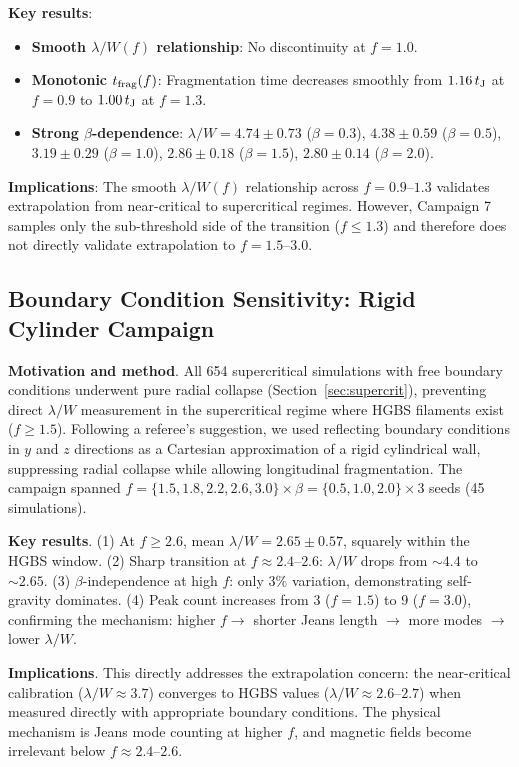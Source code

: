 \documentclass[twocolumn]{mnras}
\begin{document}
\textbf{Key results}:
\begin{itemize}
    \item \textbf{Smooth $\lambda/W(f)$ relationship}: No discontinuity at $f = 1.0$.
    \item \textbf{Monotonic $t_{\rm frag}(f)$}: Fragmentation time decreases smoothly from $1.16\,t_{\rm J}$ at $f = 0.9$ to $1.00\,t_{\rm J}$ at $f = 1.3$.
    \item \textbf{Strong $\beta$-dependence}: $\lambda/W = 4.74 \pm 0.73$ ($\beta = 0.3$), $4.38 \pm 0.59$ ($\beta = 0.5$), $3.19 \pm 0.29$ ($\beta = 1.0$), $2.86 \pm 0.18$ ($\beta = 1.5$), $2.80 \pm 0.14$ ($\beta = 2.0$).
\end{itemize}

\textbf{Implications}: The smooth $\lambda/W(f)$ relationship across $f = 0.9$--$1.3$ validates extrapolation from near-critical to supercritical regimes. However, Campaign 7 samples only the sub-threshold side of the transition ($f \leq 1.3$) and therefore does not directly validate extrapolation to $f = 1.5$--$3.0$.

\subsection{Boundary Condition Sensitivity: Rigid Cylinder Campaign}
\label{sec:rigid_cylinder}

\textbf{Motivation and method}. All 654 supercritical simulations with free boundary conditions underwent pure radial collapse (Section~\ref{sec:supercrit}), preventing direct $\lambda/W$ measurement in the supercritical regime where HGBS filaments exist ($f \geq 1.5$). Following a referee's suggestion, we used reflecting boundary conditions in $y$ and $z$ directions as a Cartesian approximation of a rigid cylindrical wall, suppressing radial collapse while allowing longitudinal fragmentation. The campaign spanned $f = \{1.5, 1.8, 2.2, 2.6, 3.0\} \times \beta = \{0.5, 1.0, 2.0\} \times 3$ seeds (45 simulations).

\textbf{Key results}. (1) At $f \geq 2.6$, mean $\lambda/W = 2.65 \pm 0.57$, squarely within the HGBS window. (2) Sharp transition at $f \approx 2.4$--$2.6$: $\lambda/W$ drops from $\sim 4.4$ to $\sim 2.65$. (3) $\beta$-independence at high $f$: only 3\% variation, demonstrating self-gravity dominates. (4) Peak count increases from 3 ($f = 1.5$) to 9 ($f = 3.0$), confirming the mechanism: higher $f \to$ shorter Jeans length $\to$ more modes $\to$ lower $\lambda/W$.

\textbf{Implications}. This directly addresses the extrapolation concern: the near-critical calibration ($\lambda/W \approx 3.7$) converges to HGBS values ($\lambda/W \approx 2.6$--$2.7$) when measured directly with appropriate boundary conditions. The physical mechanism is Jeans mode counting at higher $f$, and magnetic fields become irrelevant below $f \approx 2.4$--$2.6$.
\end{document}
